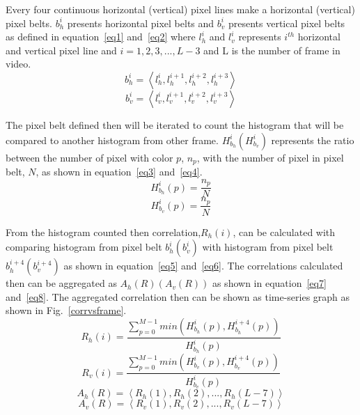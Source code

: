 \documentclass[conference]{IEEEtran}
\begin{document}
Every four continuous horizontal (vertical) pixel lines make a horizontal (vertical) pixel belts. $b_h^i$ presents horizontal pixel belts and $b_v^i$ presents vertical pixel belts as defined in equation~\ref{eq1} and~\ref{eq2} where $l_h^i$ and $l_v^i$ represents $i^{th}$ horizontal and vertical pixel line and $i=1,2,3,...,L-3$ and L is the number of frame in video.
\begin{equation}
b_h^i = \left \langle l_h^i,l_h^{i+1},l_h^{i+2},l_h^{i+3} \right \rangle
\label{eq1}
\end{equation}
\begin{equation}
b_v^i = \left \langle l_v^i,l_v^{i+1},l_v^{i+2},l_v^{i+3} \right \rangle
\label{eq2}
\end{equation}

The pixel belt defined then will be iterated to count the histogram that will be compared to another histogram from other frame. $H_{b_h}^i(H_{b_v}^i)$ represents the ratio between the number of pixel with color $p$, $n_p$, with the number of pixel in pixel belt, $N$, as shown in equation~\ref{eq3} and~\ref{eq4}.
\begin{equation}
H_{b_h}^i(p) = \frac{n_p}{N}
\label{eq3}
\end{equation}
\begin{equation}
H_{b_v}^i(p) = \frac{n_p}{N}
\label{eq4}
\end{equation}

From the histogram counted then correlation,$R_{h}(i)$, can be calculated with comparing histogram from pixel belt $b_h^i(b_v^i)$ with histogram from pixel belt $b_h^{i+4}(b_v^{i+4})$ as shown in equation~\ref{eq5} and~\ref{eq6}. The correlations calculated then can be aggregated as $A_h(R)(A_v(R))$ as shown in equation~\ref{eq7} and~\ref{eq8}. The aggregated correlation then can be shown as time-series graph as shown in Fig.~\ref{corrvsframe}.
\begin{equation}
R_{h}(i) = \frac{\sum_{p=0}^{M-1}{min(H_{b_h}^i(p),H_{b_h}^{i+4}(p))}}{H_{b_h}^i(p)}
\label{eq5}
\end{equation}
\begin{equation}
R_{v}(i) = \frac{\sum_{p=0}^{M-1}{min(H_{b_v}^i(p),H_{b_v}^{i+4}(p))}}{H_{b_v}^i(p)}
\label{eq6}
\end{equation}
\begin{equation}
A_h(R) = \left \langle R_{h}(1),R_{h}(2),...,R_{h}(L-7) \right \rangle
\label{eq7}
\end{equation}
\begin{equation}
A_v(R) = \left \langle R_{v}(1),R_{v}(2),...,R_{v}(L-7) \right \rangle
\label{eq8}
\end{equation}
\end{document}

